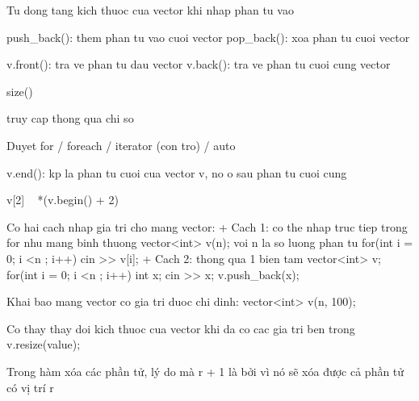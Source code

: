     Tu dong tang kich thuoc cua vector khi nhap phan tu vao
    
    push_back(): them phan tu vao cuoi vector
    pop_back(): xoa phan tu cuoi vector

    v.front(): tra ve phan tu dau vector
    v.back(): tra ve phan tu cuoi cung vector

    size()

    truy cap thong qua chi so 

    Duyet for / foreach / iterator (con tro) / auto




    v.end(): kp la phan tu cuoi cua vector v, no o sau phan tu cuoi cung

    v[2] ~ *(v.begin() + 2)

    Co hai cach nhap gia tri cho mang vector:
        + Cach 1: co the nhap truc tiep trong for nhu mang binh thuong
            vector<int> v(n);  voi n la so luong phan tu 
            for(int i = 0; i <n ; i++){
                cin >> v[i];
            }
        + Cach 2: thong qua 1 bien tam
            vector<int> v;
            for(int i = 0; i <n ; i++){
                int x;
                cin >> x;
                v.push_back(x);
            }
    
    Khai bao mang vector co gia tri duoc chi dinh:  vector<int> v(n, 100);

    Co thay thay doi kich thuoc cua vector khi da co cac gia tri ben trong
        v.resize(value);

    Trong hàm xóa các phần tử, lý do mà r + 1 là bởi vì nó sẽ xóa được cả phần tử có vị trí r